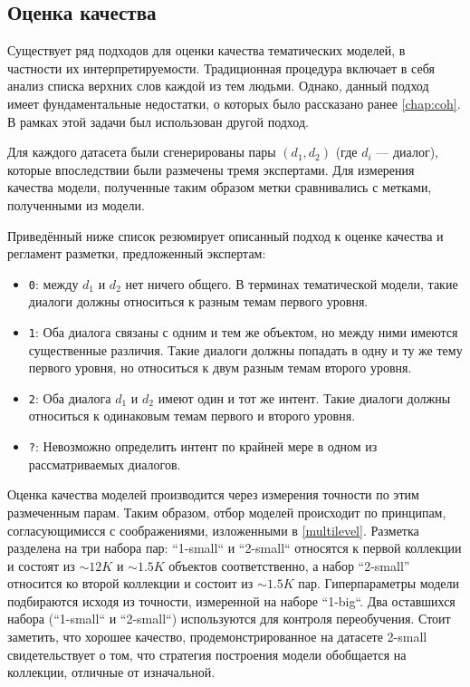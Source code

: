 \subsection{Оценка качества}
Существует ряд подходов для оценки качества тематических моделей, в частности их интерпретируемости. Традиционная процедура включает в себя анализ списка верхних слов каждой из тем людьми. Однако, данный подход имеет фундаментальные недостатки, о которых было рассказано ранее \ref{chap:coh}. В рамках этой задачи был использован другой подход.

Для каждого датасета были сгенерированы пары $(d_1, d_2)$ (где $d_i$ --- диалог), которые впоследствии были размечены тремя экспертами. Для измерения качества модели, полученные таким образом метки сравнивались с метками, полученными из модели.

Приведённый ниже список резюмирует описанный подход к оценке качества и регламент разметки, предложенный экспертам:

\begin{itemize}
    \item \texttt{0}: между $d_1$ и $d_2$ нет ничего общего. В терминах тематической модели, такие диалоги должны относиться к разным темам первого уровня.
    \item \texttt{1}: Оба диалога связаны с одним и тем же объектом, но между ними имеются существенные различия. Такие диалоги должны попадать в одну и ту же тему первого уровня, но относиться к двум разным темам второго уровня.
    \item \texttt{2}: Оба диалога $d_1$ и $d_2$ имеют один и тот же интент. Такие диалоги должны относиться к одинаковым темам первого и второго уровня.
    \item \texttt{?}: Невозможно определить интент по крайней мере в одном из рассматриваемых диалогов.
\end{itemize}

Оценка качества моделей производится через измерения точности по этим размеченным парам. Таким образом, отбор моделей происходит по принципам, согласующимисся с соображениями, изложенными в \ref{multilevel}. 
Разметка разделена на три набора пар: ``1-small`` и ``2-small`` относятся к первой коллекции и состоят из $\sim\!12K$ и $\sim1.5K$ объектов соответственно, а набор ``2-small'' относится ко второй коллекции и состоит из $\sim\!1.5K$ пар. Гиперпараметры модели подбираются исходя из точности, измеренной на  наборе ``1-big``. Два оставшихся набора (``1-small`` и ``2-small``) используются для контроля переобучения. Стоит заметить, что хорошее качество, продемонстрированное на датасете 2-small свидетельствует о том, что стратегия построения модели обобщается на коллекции, отличные от изначальной.



